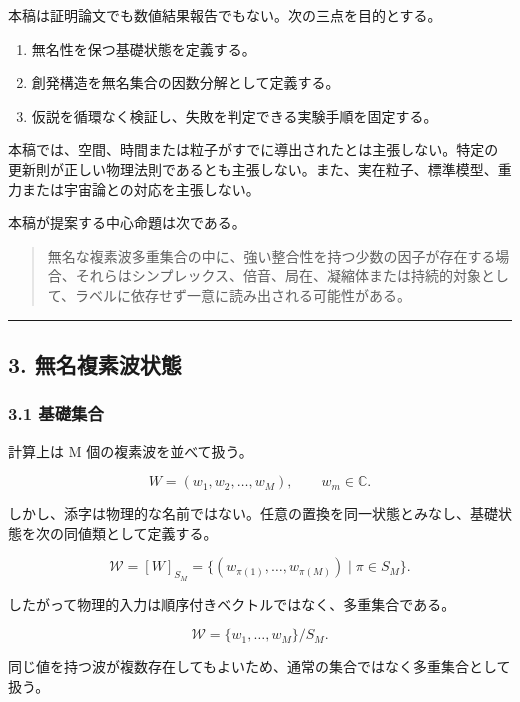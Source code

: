\documentclass[
  a4paper,
]{ltjsarticle}
\providecommand{\tightlist}{%
  \setlength{\itemsep}{0pt}\setlength{\parskip}{0pt}}
\begin{document}
本稿は証明論文でも数値結果報告でもない。次の三点を目的とする。

\begin{enumerate}
\def\labelenumi{\arabic{enumi}.}
\tightlist
\item
  無名性を保つ基礎状態を定義する。
\item
  創発構造を無名集合の因数分解として定義する。
\item
  仮説を循環なく検証し、失敗を判定できる実験手順を固定する。
\end{enumerate}

本稿では、空間、時間または粒子がすでに導出されたとは主張しない。特定の更新則が正しい物理法則であるとも主張しない。また、実在粒子、標準模型、重力または宇宙論との対応を主張しない。

本稿が提案する中心命題は次である。

\begin{quote}
無名な複素波多重集合の中に、強い整合性を持つ少数の因子が存在する場合、それらはシンプレックス、倍音、局在、凝縮体または持続的対象として、ラベルに依存せず一意に読み出される可能性がある。
\end{quote}

\begin{center}\rule{0.5\linewidth}{0.5pt}\end{center}

\subsection{3.
無名複素波状態}\label{ux7121ux540dux8907ux7d20ux6ce2ux72b6ux614b}

\subsubsection{3.1 基礎集合}\label{ux57faux790eux96c6ux5408}

計算上は M 個の複素波を並べて扱う。

\[
W=(w_1,w_2,\ldots,w_M),
\qquad
w_m\in\mathbb C.
\]

しかし、添字は物理的な名前ではない。任意の置換を同一状態とみなし、基礎状態を次の同値類として定義する。

\[
\mathcal W
=
[W]_{S_M}
=
\{(w_{\pi(1)},\ldots,w_{\pi(M)})\mid \pi\in S_M\}.
\]

したがって物理的入力は順序付きベクトルではなく、多重集合である。

\[
\mathcal W
=
\{w_1,\ldots,w_M\}/S_M.
\]

同じ値を持つ波が複数存在してもよいため、通常の集合ではなく多重集合として扱う。
\end{document}
